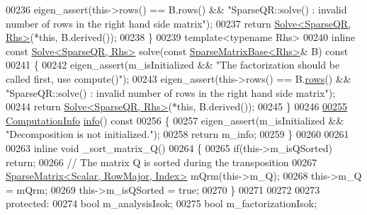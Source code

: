 \begin{DoxyCode}
00236       eigen\_assert(this->rows() == B.rows() && \textcolor{stringliteral}{"SparseQR::solve() : invalid number of rows in the right
       hand side matrix"});
00237       \textcolor{keywordflow}{return} \hyperlink{group___core___module_class_eigen_1_1_solve}{Solve<SparseQR, Rhs>}(*\textcolor{keyword}{this}, B.derived());
00238     \}
00239     \textcolor{keyword}{template}<\textcolor{keyword}{typename} Rhs>
00240     \textcolor{keyword}{inline} \textcolor{keyword}{const} \hyperlink{group___core___module_class_eigen_1_1_solve}{Solve<SparseQR, Rhs>} solve(\textcolor{keyword}{const} 
      \hyperlink{group___sparse_core___module_class_eigen_1_1_sparse_matrix_base}{SparseMatrixBase<Rhs>}& B)\textcolor{keyword}{ const}
00241 \textcolor{keyword}{    }\{
00242           eigen\_assert(m\_isInitialized && \textcolor{stringliteral}{"The factorization should be called first, use compute()"});
00243           eigen\_assert(this->rows() == B.\hyperlink{group___sparse_core___module_a1944e9fa9ce7937bfc3a87b2cb94371f}{rows}() && \textcolor{stringliteral}{"SparseQR::solve() : invalid number of rows in the
       right hand side matrix"});
00244           \textcolor{keywordflow}{return} \hyperlink{group___core___module_class_eigen_1_1_solve}{Solve<SparseQR, Rhs>}(*\textcolor{keyword}{this}, B.derived());
00245     \}
00246     
\hyperlink{group___sparse_q_r___module_a234b0580aaf57237393f2e73a3d38690}{00255}     \hyperlink{group__enums_ga85fad7b87587764e5cf6b513a9e0ee5e}{ComputationInfo} \hyperlink{group___sparse_q_r___module_a234b0580aaf57237393f2e73a3d38690}{info}()\textcolor{keyword}{ const}
00256 \textcolor{keyword}{    }\{
00257       eigen\_assert(m\_isInitialized && \textcolor{stringliteral}{"Decomposition is not initialized."});
00258       \textcolor{keywordflow}{return} m\_info;
00259     \}
00260 
00261 
00263     \textcolor{keyword}{inline} \textcolor{keywordtype}{void} \_sort\_matrix\_Q()
00264     \{
00265       \textcolor{keywordflow}{if}(this->m\_isQSorted) \textcolor{keywordflow}{return};
00266       \textcolor{comment}{// The matrix Q is sorted during the transposition}
00267       \hyperlink{group___sparse_core___module_class_eigen_1_1_sparse_matrix}{SparseMatrix<Scalar, RowMajor, Index>} mQrm(this->m\_Q);
00268       this->m\_Q = mQrm;
00269       this->m\_isQSorted = \textcolor{keyword}{true};
00270     \}
00271 
00272     
00273   \textcolor{keyword}{protected}:
00274     \textcolor{keywordtype}{bool} m\_analysisIsok;
00275     \textcolor{keywordtype}{bool} m\_factorizationIsok;

\end{DoxyCode}
